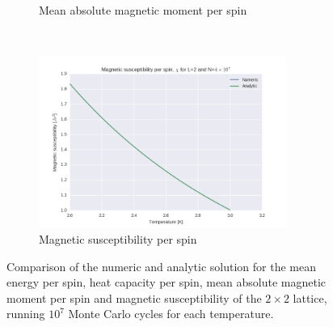 \documentclass[a4paper, 10pt]{article}
\begin{document}
\begin{figure}[!ht]
\begin{subfigure}[H!]{0.5\textwidth}
        \caption{Mean absolute magnetic moment per spin}
    \end{subfigure}%
    ~ 
    \begin{subfigure}[H!]{0.5\textwidth}
        \centering
        \includegraphics[height=2.2in]{L2MagSus4e7.png}
        \caption{Magnetic susceptibility per spin}
    \end{subfigure}
    \caption{Comparison of the numeric and  analytic solution for the mean energy per spin, heat capacity per spin, mean absolute magnetic moment per spin and magnetic susceptibility of the $2 \times 2$ lattice, running $10^7$ Monte Carlo cycles for each temperature. }\label{fig:2x2_thermo}
\end{figure}
\newpage
\end{document}
